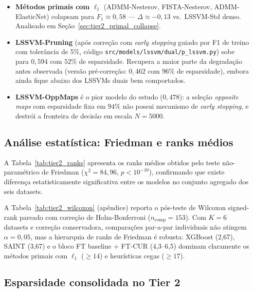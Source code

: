 \documentclass[12pt,a4paper]{article}
\begin{document}
\begin{itemize}
        $0{,}69$, um degrau abaixo do LSSVM-Std, com esparsidades amostrais
        entre $60\%$ (IP) e $92\%$ (FSA).
  \item \textbf{Métodos primais com $\ell_1$} (ADMM-Nesterov, FISTA-Nesterov,
        ADMM-ElasticNet) colapsam para $F_1 \approx 0{,}58$ ---
        $\Delta \approx -0{,}13$ vs.\ LSSVM-Std denso. Analisado em
        Seção~\ref{sec:tier2_primal_collapse}.
  \item \textbf{LSSVM-Pruning} (após correção com \emph{early stopping}
        guiado por F1 de treino com tolerância de 5\%, código
        \texttt{src/models/lssvm/dual/p\_lssvm.py}) sobe para $0{,}594$
        com $52\%$ de esparsidade. Recupera a maior parte da degradação
        antes observada (versão pré-correção: $0{,}462$ com $96\%$ de
        esparsidade), embora ainda fique abaixo dos LSSVMs duais bem
        comportados.
  \item \textbf{LSSVM-OppMaps} é o pior modelo do estudo ($0{,}478$): a
        seleção \emph{opposite maps} com esparsidade fixa em $94\%$ não
        possui mecanismo de \emph{early stopping}, e destrói a fronteira
        de decisão em escala $N=5000$.
\end{itemize}

\subsection{Análise estatística: Friedman e ranks médios}

A Tabela~\ref{tab:tier2_ranks} apresenta os ranks médios obtidos pelo teste
não-paramétrico de Friedman ($\chi^2 = 84{,}96$, $p < 10^{-10}$), confirmando
que existe diferença estatisticamente significativa entre os modelos no
conjunto agregado dos seis datasets.



A Tabela~\ref{tab:tier2_wilcoxon} (apêndice) reporta o pós-teste de Wilcoxon
signed-rank pareado com correção de Holm-Bonferroni ($n_{\text{comp}}=153$).
Com $K=6$ datasets e correção conservadora, comparações par-a-par individuais
não atingem $\alpha=0{,}05$, mas a hierarquia de ranks de Friedman é
robusta: XGBoost (2,67), SAINT (3,67) e o bloco FT baseline + FT-CUR
(4,3--6,5) dominam claramente os métodos primais com $\ell_1$ ($\geq 14$) e
heurísticas cegas ($\geq 17$).

\subsection{Esparsidade consolidada no Tier 2}
\label{sec:tier2_sparsity}
\end{document}

